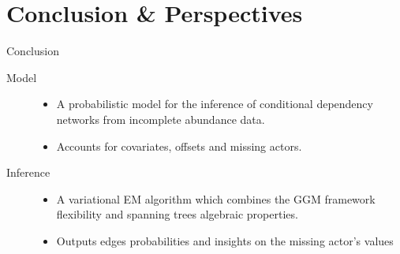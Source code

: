 \documentclass[11pt]{beamer}
\begin{document}
  \section{Conclusion \& Perspectives}
 \begin{frame}{Conclusion}
 
 \begin{description}
 \item[Model] \begin{itemize}
 \item A probabilistic model for the inference of conditional dependency networks from incomplete abundance data.
 \item Accounts for covariates, offsets and missing actors.
 \end{itemize}
 \vspace{1cm}
 \item[Inference]\begin{itemize}
  \item A variational EM algorithm which combines the GGM framework flexibility and spanning trees algebraic properties.
  \item Outputs edges probabilities and insights on the missing actor's values
 \end{itemize}
 \end{description}
 \end{frame}
\end{document}
